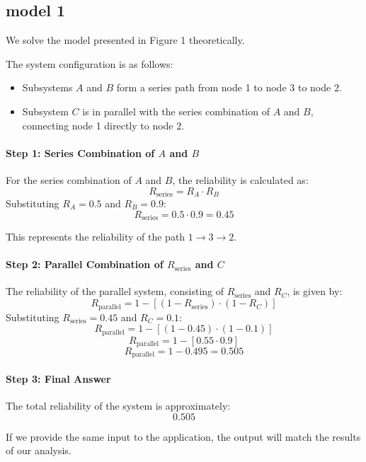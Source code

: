 \documentclass[12pt	]{article}
\begin{document}
\subsection{model 1}
We solve the model presented in Figure 1 theoretically.


The system configuration is as follows:
\begin{itemize}
	\item Subsystems $A$ and $B$ form a series path from node 1 to node 3 to node 2.
	\item Subsystem $C$ is in parallel with the series combination of $A$ and $B$, connecting node 1 directly to node 2.
\end{itemize}


\paragraph{Step 1: Series Combination of $A$ and $B$}

For the series combination of $A$ and $B$, the reliability is calculated as:
\[
R_{\text{series}} = R_A \cdot R_B
\]
Substituting $R_A = 0.5$ and $R_B = 0.9$:
\[
R_{\text{series}} = 0.5 \cdot 0.9 = 0.45
\]

This represents the reliability of the path $1 \to 3 \to 2$.


\paragraph{Step 2: Parallel Combination of $R_{\text{series}}$ and $C$}

The reliability of the parallel system, consisting of $R_{\text{series}}$ and $R_C$, is given by:
\[
R_{\text{parallel}} = 1 - \left[(1 - R_{\text{series}}) \cdot (1 - R_C)\right]
\]
Substituting $R_{\text{series}} = 0.45$ and $R_C = 0.1$:
\[
R_{\text{parallel}} = 1 - \left[(1 - 0.45) \cdot (1 - 0.1)\right]
\]
\[
R_{\text{parallel}} = 1 - \left[0.55 \cdot 0.9\right]
\]
\[
R_{\text{parallel}} = 1 - 0.495 = 0.505
\]


\paragraph{Step 3: Final Answer}

The total reliability of the system is approximately:
\[
\boxed{0.505}
\]


If we provide the same input to the application, the output will match the results of our analysis.

\newpage
\end{document}
